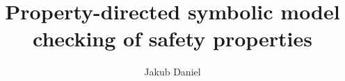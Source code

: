 \documentclass[d3s]{beamer}
\title{Property-directed symbolic model checking of safety properties}
\author{Jakub Daniel}
\begin{document}
\titleframe
\end{document}
